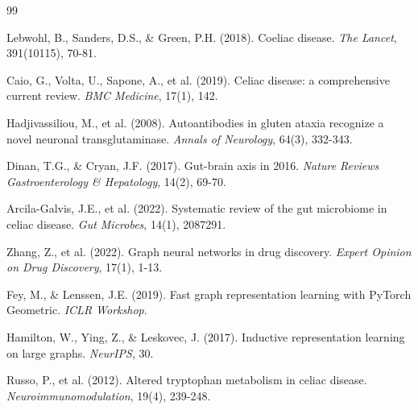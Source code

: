 \documentclass[12pt]{article}
\begin{document}
\begin{thebibliography}{99}

Lebwohl, B., Sanders, D.S., \& Green, P.H. (2018).
Coeliac disease.
\textit{The Lancet}, 391(10115), 70-81.

Caio, G., Volta, U., Sapone, A., et al. (2019).
Celiac disease: a comprehensive current review.
\textit{BMC Medicine}, 17(1), 142.

Hadjivassiliou, M., et al. (2008).
Autoantibodies in gluten ataxia recognize a novel neuronal transglutaminase.
\textit{Annals of Neurology}, 64(3), 332-343.

Dinan, T.G., \& Cryan, J.F. (2017).
Gut-brain axis in 2016.
\textit{Nature Reviews Gastroenterology \& Hepatology}, 14(2), 69-70.

Arcila-Galvis, J.E., et al. (2022).
Systematic review of the gut microbiome in celiac disease.
\textit{Gut Microbes}, 14(1), 2087291.

Zhang, Z., et al. (2022).
Graph neural networks in drug discovery.
\textit{Expert Opinion on Drug Discovery}, 17(1), 1-13.

Fey, M., \& Lenssen, J.E. (2019).
Fast graph representation learning with PyTorch Geometric.
\textit{ICLR Workshop}.

Hamilton, W., Ying, Z., \& Leskovec, J. (2017).
Inductive representation learning on large graphs.
\textit{NeurIPS}, 30.

Russo, P., et al. (2012).
Altered tryptophan metabolism in celiac disease.
\textit{Neuroimmunomodulation}, 19(4), 239-248.

\end{thebibliography}
\end{document}

